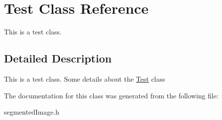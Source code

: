 \hypertarget{classTest}{
\section{Test Class Reference}
\label{classTest}
}


This is a test class.  




\subsection{Detailed Description}
This is a test class. Some details about the \hyperlink{classTest}{Test} class 

The documentation for this class was generated from the following file:\begin{DoxyCompactItemize}
\item 
segmentedImage.h\end{DoxyCompactItemize}
